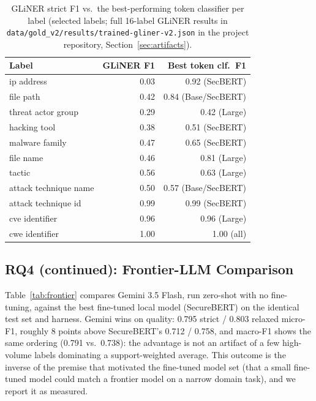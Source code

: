 \documentclass[11pt]{article}
\begin{document}
\begin{table}[t]
\centering
\footnotesize
\setlength{\tabcolsep}{2pt}
\begin{tabular}{lrr}
\toprule
Label & GLiNER F1 & Best token clf.\ F1 \\
\midrule
ip address                 & 0.03 & 0.92 (SecBERT) \\
file path                  & 0.42 & 0.84 (Base/SecBERT) \\
threat actor group         & 0.29 & 0.42 (Large) \\
hacking tool                & 0.38 & 0.51 (SecBERT) \\
malware family              & 0.47 & 0.65 (SecBERT) \\
file name                  & 0.46 & 0.81 (Large) \\
tactic                     & 0.56 & 0.63 (Large) \\
attack technique name       & 0.50 & 0.57 (Base/SecBERT) \\
attack technique id        & 0.99 & 0.99 (SecBERT) \\
cve identifier               & 0.96 & 0.96 (Large) \\
cwe identifier                & 1.00 & 1.00 (all) \\
\bottomrule
\end{tabular}
\caption{GLiNER strict F1 vs.\ the best-performing token classifier per
label (selected labels; full 16-label GLiNER results in
\texttt{data/gold\_v2/results/trained-gliner-v2.json} in the project
repository, Section~\ref{sec:artifacts}).}
\label{tab:gliner-per-label}
\end{table}

\subsection{RQ4 (continued): Frontier-LLM Comparison}

Table~\ref{tab:frontier} compares Gemini 3.5 Flash, run zero-shot with no
fine-tuning, against the best fine-tuned local model (SecureBERT) on the
identical test set and harness. Gemini wins on quality: 0.795 strict /
0.803 relaxed micro-F1, roughly 8 points above SecureBERT's 0.712 / 0.758,
and macro-F1 shows the same ordering (0.791 vs.\ 0.738): the advantage is
not an artifact of a few high-volume labels dominating a support-weighted
average. This outcome is the inverse of the premise that motivated the
fine-tuned model set (that a small fine-tuned model could match a frontier
model on a narrow domain task), and we report it as measured.
\end{document}
